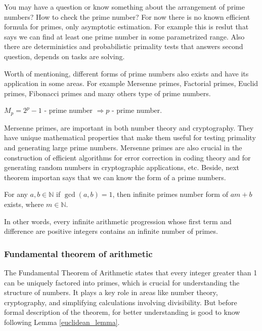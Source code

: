 \documentclass[../lecture-notes.tex]{subfiles}
\begin{document}
You may have a question or know something about the arrangement of prime numbers? 
How to check the prime number? 
For now there is no known efficient formula for primes, only asymptotic estimation.
For example this is reslut that says we can find at least one prime number in some parametrized range.
Also there are deterministics and probabilistic primality tests that answers second question, depends on tasks are solving.

Worth of mentioning, different forms of prime numbers also exists and have its application in some areas. For example Mersenne primes, Factorial primes, Euclid primes, Fibonacci primes and many others type of prime numbers.

\begin{definition} 
    $M_p = 2^p - 1$ - prime number $\Rightarrow p$ - prime number.
\end{definition}

Mersenne primes, are important in both number theory and cryptography.
They have unique mathematical properties that make them useful for testing primality and generating large prime numbers.
Mersenne primes are also crucial in the construction of efficient algorithms for error correction in coding theory and for generating random numbers in cryptographic applications, etc. 
Beside, next theorem importan says that we can know the form of a prime numbers.

\begin{theorem} 
    For any $a, b \in \mathbb{N}$ if $\gcd(a, b) = 1$, then infinite primes number form of $am + b$ exists, where $m \in \mathbb{N}$.
\end{theorem}

In other words, every infinite arithmetic progression whose first term and difference are positive integers contains an infinite number of primes.


\subsubsection{Fundamental theorem of arithmetic}
The Fundamental Theorem of Arithmetic states that every integer greater than 1 can be uniquely factored into primes, which is crucial for understanding the structure of numbers. 
It plays a key role in areas like number theory, cryptography, and simplifying calculations involving divisibility. 
But before formal description of the theorem, for better understanding is good to know following Lemma \ref{euclidean_lemma}.
\end{document}

